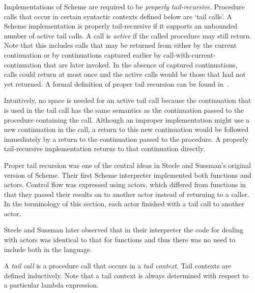 Implementations of Scheme are required to be
{\em properly tail-recursive}.
Procedure calls that occur in certain syntactic
contexts defined below are `tail calls'.  A Scheme implementation is
properly tail-recursive if it supports an unbounded number of active
tail calls.  A call is {\em active} if the called procedure may still
return.  Note that this includes calls that may be returned from either
by the current continuation or by continuations captured earlier by
{\cf call-with-current-continuation} that are later invoked.
In the absence of captured continuations, calls could
return at most once and the active calls would be those that had not
yet returned.
A formal definition of proper tail recursion can be found
in~\cite{propertailrecursion}.

\begin{rationale}

Intuitively, no space is needed for an active tail call because the
continuation that is used in the tail call has the same semantics as the
continuation passed to the procedure containing the call.  Although an improper
implementation might use a new continuation in the call, a return
to this new continuation would be followed immediately by a return
to the continuation passed to the procedure.  A properly tail-recursive
implementation returns to that continuation directly.

Proper tail recursion was one of the central ideas in Steele and
Sussman's original version of Scheme.  Their first Scheme interpreter
implemented both functions and actors.  Control flow was expressed using
actors, which differed from functions in that they passed their results
on to another actor instead of returning to a caller.  In the terminology
of this section, each actor finished with a tail call to another actor.

Steele and Sussman later observed that in their interpreter the code
for dealing with actors was identical to that for functions and thus
there was no need to include both in the language.

\end{rationale}

A {\em tail call} is a procedure call that occurs
in a {\em tail context}.  Tail contexts are defined inductively.  Note
that a tail context is always determined with respect to a particular lambda
expression.

